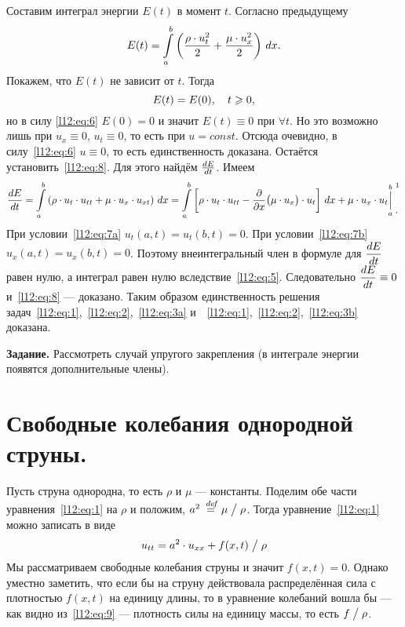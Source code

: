 Составим интеграл энергии $E(t)$ в момент $t$. Согласно предыдущему 
\begin{equation*}
	\hfill E(t)=\int\limits_a^b\left(\frac{\rho\cdot u^2_t}{2}+\frac{\mu\cdot u^2_x}{2}\right)\,dx.\hfill
\end{equation*} 
Покажем, что $E(t)$ не зависит от $t$. Тогда 
\begin{equation}
	\label{l12:eq:8}
	\hfill E(t)=E(0),\quad t\geqslant0,\hfill
\end{equation}
но в силу \eqref{l12:eq:6} $E(0)=0$ и значит $E(t)\equiv0$ при $\forall t$. Но это возможно лишь при $u_x\equiv0$, $u_t\equiv0$, то есть при $u=const$. Отсюда очевидно, в силу~\eqref{l12:eq:6} $u\equiv0$, то есть единственность доказана. Остаётся установить~\eqref{l12:eq:8}. Для этого найдём $\frac{dE}{dt}$. Имеем 
\begin{equation*}
	\der{E}{t}=\int\limits_a^b\left(\rho\cdot u_t\cdot u_{tt}+\mu\cdot u_x\cdot u_{xt}\right)\,dx=\int\limits_a^b\left[\rho\cdot u_t\cdot u_{tt}-\pder{}{x}\big(\mu\cdot u_x\big)\cdot u_t\right]\,dx+\mu\cdot u_x\cdot u_t{\mathop{\Big|}\limits_a^b}\phantom{|}{\vphantom{\bigg|}}^{\footnotemark{}}_{\displaystyle.}
\end{equation*}
При условии~\eqref{l12:eq:7a} $u_t(a,t)=u_t(b,t)=0$. При условии~\eqref{l12:eq:7b} $u_x(a,t)=u_x(b,t)=0$. Поэтому внеинтегральный член в формуле для $\displaystyle\frac{dE}{dt}$ равен нулю, а интеграл равен нулю вследствие~\eqref{l12:eq:5}. Следовательно $\displaystyle\frac{dE}{dt}\equiv0$ и~\eqref{l12:eq:8} --- доказано. Таким образом единственность решения задач~\eqref{l12:eq:1},~\eqref{l12:eq:2},~\eqref{l12:eq:3a} и~~\eqref{l12:eq:1},~\eqref{l12:eq:2},~\eqref{l12:eq:3b} доказана.
\vspace{0.2cm}

\noindent\textbf{Задание. }Рассмотреть случай упругого закрепления (в интеграле энергии появятся дополнительные члены).

\section{Свободные колебания однородной струны.}
\label{lecture11section2}
Пусть струна однородна, то есть $\rho$ и $\mu$ --- константы. Поделим обе части уравнения~\eqref{l12:eq:1} на $\rho$ и положим, $a^2\stackrel{\hspace{0.09 cm}de\!f}{=}{\mu}\bigm/{\rho}$. Тогда уравнение~\eqref{l12:eq:1} можно записать в виде
\begin{equation}
	\label{l12:eq:9}
	\hfill u_{tt}=a^2\cdot u_{xx}+f(x,t)\bigm/\rho\hfill
\end{equation}
Мы рассматриваем свободные колебания струны и значит $f(x,t)=0$. Однако уместно заметить, что если бы на струну действовала распределённая сила с плотностью $f(x,t)$ на единицу длины, то в уравнение колебаний вошла бы --- как видно из~\eqref{l12:eq:9} --- плотность силы на единицу массы, то есть $f\bigm/\rho$.


